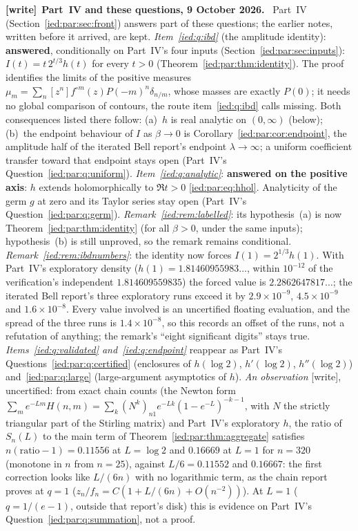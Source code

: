 \documentclass[11pt,letterpaper]{article}
\theoremstyle{remark}\newtheorem{remark}[theorem]{Remark}
\newenvironment{writenote}[1][]{\par\smallskip\begingroup\small
 \noindent\textbf{[write]}\if\relax\detokenize{#1}\relax\else~\textbf{#1.}\fi\ }%
 {\par\endgroup\smallskip}
\begin{document}
\begin{writenote}[Part~IV and these questions, 9 October 2026]
Part~IV (Section~\ref{ied:par:sec:front}) answers part of these questions;
the earlier notes, written before it arrived, are kept.
\emph{Item~\ref{ied:q:ibd}} (the amplitude identity): \textbf{answered},
conditionally on Part~IV's four inputs (Section~\ref{ied:par:sec:inputs}):
$I(t)=t\,2^{t/3}h(t)$ for every $t>0$ (Theorem~\ref{ied:par:thm:identity}).
The proof identifies the limits of the positive measures
$\mu_m=\sum_n[z^n]f^{\circ m}(z)P(-m)^n\delta_{n/m}$, whose masses are exactly
$P(0)$; it needs no global comparison of contours, the route item~\ref{ied:q:ibd}
calls missing. Both consequences listed there follow: (a)~$h$ is real
analytic on $(0,\infty)$ (below); (b)~the endpoint behaviour of $I$ as
$\beta\to0$ is Corollary~\ref{ied:par:cor:endpoint}, the amplitude half of the
iterated Bell report's endpoint $\lambda\to\infty$; a uniform coefficient
transfer toward that endpoint stays open (Part~IV's
Question~\ref{ied:par:q:uniform}). \emph{Item~\ref{ied:q:analytic}}:
\textbf{answered on the positive axis}: $h$ extends holomorphically to
$\Re t>0$ \eqref{ied:par:eq:hhol}. Analyticity of the germ $g$ at zero and its
Taylor series stay open (Part~IV's Question~\ref{ied:par:q:germ}).
\emph{Remark~\ref{ied:rem:labelled}}: its hypothesis~(a) is now
Theorem~\ref{ied:par:thm:identity} (for all $\beta>0$, under the same inputs);
hypothesis~(b) is still unproved, so the remark remains conditional.
\emph{Remark~\ref{ied:rem:ibdnumbers}}: the identity now forces
$I(1)=2^{1/3}h(1)$. With Part~IV's exploratory density
($h(1)=1.81460955983\ldots$, within $10^{-12}$ of the verification's
independent $1.814609559835$) the forced value is
$2.2862647817\ldots$; the iterated Bell report's three exploratory runs exceed
it by $2.9\times10^{-9}$, $4.5\times10^{-9}$ and $1.6\times10^{-8}$. Every value
involved is an uncertified floating evaluation, and the spread of the three
runs is $1.4\times10^{-8}$, so this records an offset of the runs, not a
refutation of anything; the remark's ``eight significant digits'' stays true.
\emph{Items~\ref{ied:q:validated} and~\ref{ied:q:endpoint}} reappear as Part~IV's
Questions~\ref{ied:par:q:certified} (enclosures of $h(\log2)$, $h'(\log2)$,
$h''(\log2)$) and~\ref{ied:par:q:large} (large-argument asymptotics of $h$).
\emph{An observation} [write], uncertified: from exact chain counts (the Newton
form $\sum_me^{-Lm}H(n,m)=\sum_k(N^k)_{n1}e^{-Lk}(1-e^{-L})^{-k-1}$, with $N$ the
strictly triangular part of the Stirling matrix) and Part~IV's exploratory
$h$, the ratio of $S_n(L)$ to the main term of
Theorem~\ref{ied:par:thm:aggregate} satisfies $n(\text{ratio}-1)=0.11556$ at
$L=\log2$ and $0.16669$ at $L=1$ for $n=320$ (monotone in $n$ from $n=25$), against
$L/6=0.11552$ and $0.16667$: the first correction looks like $L/(6n)$ with no
logarithmic term, as the chain report proves at $q=1$
($z_n/f_n=C(1+L/(6n)+O(n^{-2}))$). At $L=1$ ($q=1/(e-1)$, outside that
report's disk) this is evidence on Part~IV's Question~\ref{ied:par:q:summation},
not a proof.
\end{writenote}
\end{document}
